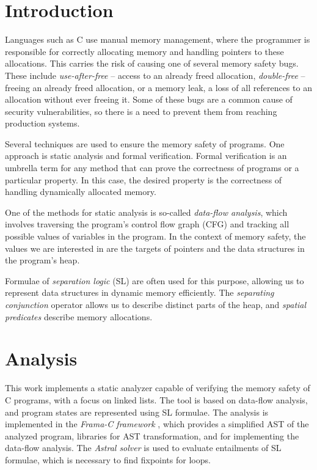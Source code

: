 \documentclass{ExcelAtFIT}
\affiliation{*%
  \href{mailto:xbrabl04@stud.fit.vutbr.cz}{xbrabl04@stud.fit.vutbr.cz},
  \textit{Faculty of Information Technology, Brno University of Technology}}
\begin{document}
\startdocument

\section{Introduction}

Languages such as C use manual memory management, where the programmer is responsible for correctly allocating memory and handling pointers to these allocations. This carries the risk of causing one of several memory safety bugs. These include \textit{use-after-free} -- access to an already freed allocation, \textit{double-free} -- freeing an already freed allocation, or a memory leak, a loss of all references to an allocation without ever freeing it. Some of these bugs are a common cause of security vulnerabilities, so there is a need to prevent them from reaching production systems.

Several techniques are used to ensure the memory safety of programs. One approach is static analysis and formal verification. Formal verification is an umbrella term for any method that can prove the correctness of programs or a particular property. In this case, the desired property is the correctness of handling dynamically allocated memory.

One of the methods for static analysis is so-called \textit{data-flow analysis}, which involves traversing the program's control flow graph (CFG) and tracking all possible values of variables in the program. In the context of memory safety, the values we are interested in are the targets of pointers and the data structures in the program's heap. 

Formulae of \textit{separation logic} (SL) are often used for this purpose, allowing us to represent data structures in dynamic memory efficiently.  The \textit{separating conjunction} operator allows us to describe distinct parts of the heap, and \textit{spatial predicates} describe memory allocations.

\section{Analysis}

This work implements a static analyzer capable of verifying the memory safety of C programs, with a focus on linked lists. The tool is based on data-flow analysis, and program states are represented using SL formulae. The analysis is implemented in the \textit{Frama-C framework} \cite{frama_c}, which provides a simplified AST of the analyzed program, libraries for AST transformation, and for implementing the data-flow analysis. The \textit{Astral solver} \cite{astral} is used to evaluate entailments of SL formulae, which is necessary to find fixpoints for loops.
\end{document}
